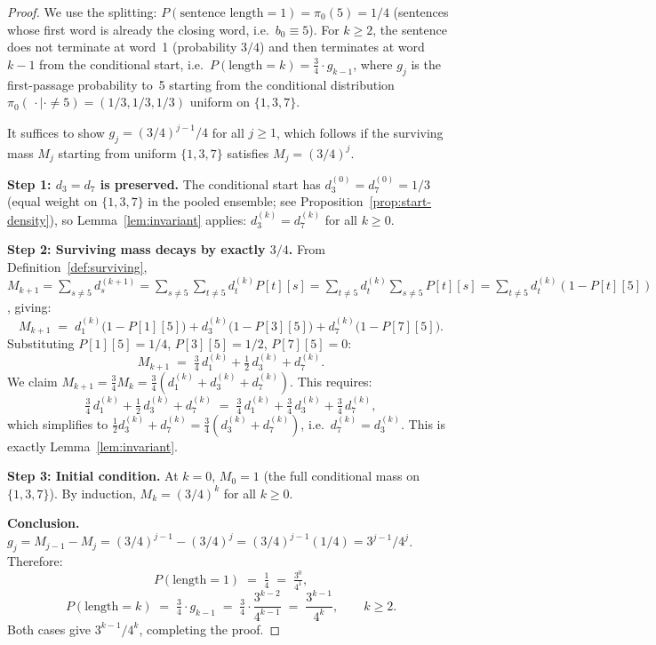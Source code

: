 \documentclass[12pt]{article}
\theoremstyle{definition}
\theoremstyle{remark}
\begin{document}
\begin{proof}
We use the splitting: $P(\text{sentence length} = 1) = \pi_0(5) = 1/4$ (sentences
whose first word is already the closing word, i.e.\ $b_0 \equiv 5$).
For $k \geq 2$, the sentence does not terminate at word~1 (probability $3/4$)
and then terminates at word $k-1$ from the conditional start, i.e.\
$P(\text{length} = k) = \tfrac{3}{4} \cdot g_{k-1}$,
where $g_j$ is the first-passage probability to~5 starting from the
conditional distribution $\pi_0(\,\cdot \mid \cdot \neq 5) = (1/3, 1/3, 1/3)$
uniform on $\{1,3,7\}$.

It suffices to show $g_j = (3/4)^{j-1}/4$ for all $j \geq 1$,
which follows if the surviving mass $M_j$ starting from uniform
$\{1,3,7\}$ satisfies $M_j = (3/4)^j$.

\medskip
\noindent\textbf{Step 1: $d_3 = d_7$ is preserved.}
The conditional start has $d_3^{(0)} = d_7^{(0)} = 1/3$ (equal weight on
$\{1,3,7\}$ in the pooled ensemble; see Proposition~\ref{prop:start-density}), so
Lemma~\ref{lem:invariant} applies: $d_3^{(k)} = d_7^{(k)}$ for all $k \geq 0$.

\medskip
\noindent\textbf{Step 2: Surviving mass decays by exactly $3/4$.}
From Definition~\ref{def:surviving}, $M_{k+1} = \sum_{s \neq 5} d_s^{(k+1)}
= \sum_{s \neq 5}\sum_{t \neq 5} d_t^{(k)} P[t][s]
= \sum_{t \neq 5} d_t^{(k)} \sum_{s \neq 5} P[t][s]
= \sum_{t \neq 5} d_t^{(k)}(1 - P[t][5])$, giving:
\[
  M_{k+1} \;=\; d_1^{(k)}\bigl(1 - P[1][5]\bigr)
               + d_3^{(k)}\bigl(1 - P[3][5]\bigr)
               + d_7^{(k)}\bigl(1 - P[7][5]\bigr).
\]
Substituting $P[1][5] = 1/4$, $P[3][5] = 1/2$, $P[7][5] = 0$:
\[
  M_{k+1} \;=\; \tfrac{3}{4}\,d_1^{(k)} + \tfrac{1}{2}\,d_3^{(k)} + d_7^{(k)}.
\]
We claim $M_{k+1} = \tfrac{3}{4} M_k = \tfrac{3}{4}(d_1^{(k)} + d_3^{(k)} + d_7^{(k)})$.
This requires:
\[
  \tfrac{3}{4}\,d_1^{(k)} + \tfrac{1}{2}\,d_3^{(k)} + d_7^{(k)}
  \;=\; \tfrac{3}{4}\,d_1^{(k)} + \tfrac{3}{4}\,d_3^{(k)} + \tfrac{3}{4}\,d_7^{(k)},
\]
which simplifies to $\tfrac{1}{2}d_3^{(k)} + d_7^{(k)} = \tfrac{3}{4}(d_3^{(k)} + d_7^{(k)})$,
i.e.\ $d_7^{(k)} = d_3^{(k)}$. This is exactly Lemma~\ref{lem:invariant}.

\medskip
\noindent\textbf{Step 3: Initial condition.}
At $k = 0$, $M_0 = 1$ (the full conditional mass on $\{1,3,7\}$).
By induction, $M_k = (3/4)^k$ for all $k \geq 0$.

\medskip
\noindent\textbf{Conclusion.}
$g_j = M_{j-1} - M_j = (3/4)^{j-1} - (3/4)^j = (3/4)^{j-1}(1/4) = 3^{j-1}/4^j$.
Therefore:
\[
  P(\text{length} = 1) \;=\; \tfrac{1}{4} \;=\; \tfrac{3^0}{4^1},
\]
\[
  P(\text{length} = k) \;=\; \tfrac{3}{4} \cdot g_{k-1}
  \;=\; \tfrac{3}{4} \cdot \frac{3^{k-2}}{4^{k-1}}
  \;=\; \frac{3^{k-1}}{4^k}, \qquad k \geq 2.
\]
Both cases give $3^{k-1}/4^k$, completing the proof.
\end{proof}
\end{document}
